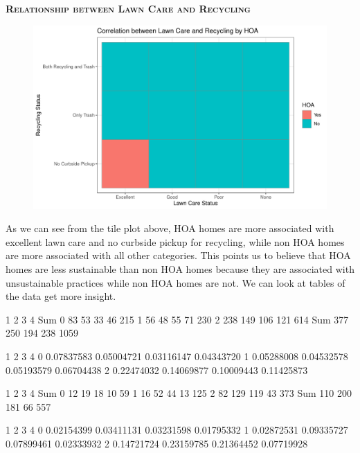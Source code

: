 \documentclass{article}
\begin{document}
\newpage
\textsc{\textbf{Relationship between Lawn Care and Recycling}}
\newline
\newline
\begin{figure}[H]
		\centering
\includegraphics{exam23-031}
		\label{Fig:plot11}
	\end{figure}
As we can see from the tile plot above, HOA homes are more associated with excellent lawn care and no curbside pickup for recycling, while non HOA homes are more associated with all other categories. This points us to believe that HOA homes are less sustainable than non HOA homes because they are associated with unsustainable practices while non HOA homes are not. We can look at tables of the data get more insight. 
\begin{Schunk}
\begin{Soutput}
         1    2    3    4  Sum
  0     83   53   33   46  215
  1     56   48   55   71  230
  2    238  149  106  121  614
  Sum  377  250  194  238 1059
\end{Soutput}
\begin{Soutput}
             1          2          3          4
  0 0.07837583 0.05004721 0.03116147 0.04343720
  1 0.05288008 0.04532578 0.05193579 0.06704438
  2 0.22474032 0.14069877 0.10009443 0.11425873
\end{Soutput}
\begin{Soutput}
        1   2   3   4 Sum
  0    12  19  18  10  59
  1    16  52  44  13 125
  2    82 129 119  43 373
  Sum 110 200 181  66 557
\end{Soutput}
\begin{Soutput}
             1          2          3          4
  0 0.02154399 0.03411131 0.03231598 0.01795332
  1 0.02872531 0.09335727 0.07899461 0.02333932
  2 0.14721724 0.23159785 0.21364452 0.07719928
\end{Soutput}
\end{Schunk}
\end{document}
